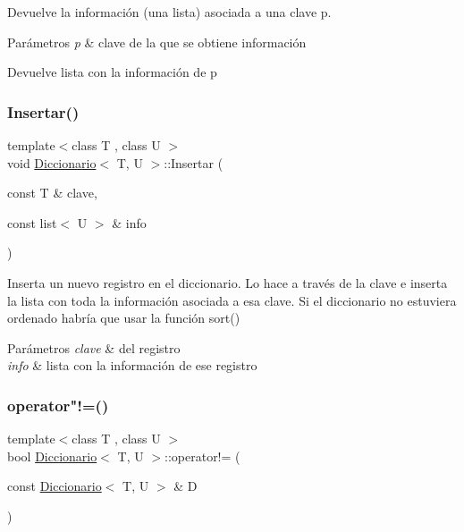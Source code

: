 Devuelve la información (una lista) asociada a una clave p. 


\begin{DoxyParams}{Parámetros}
{\em p} & clave de la que se obtiene información \\
\hline
\end{DoxyParams}
\begin{DoxyReturn}{Devuelve}
lista con la información de p 
\end{DoxyReturn}
\mbox{\label{classDiccionario_af520b73907852cc8002260ddf9fb822c}} 
\subsubsection{\texorpdfstring{Insertar()}{Insertar()}}
{\footnotesize\ttfamily template$<$class T , class U $>$ \\
void \hyperlink{classDiccionario}{Diccionario}$<$ T, U $>$\+::Insertar (\begin{DoxyParamCaption}\item[{const T \&}]{clave,  }\item[{const list$<$ U $>$ \&}]{info }\end{DoxyParamCaption})}



Inserta un nuevo registro en el diccionario. Lo hace a través de la clave e inserta la lista con toda la información asociada a esa clave. Si el diccionario no estuviera ordenado habría que usar la función sort() 


\begin{DoxyParams}{Parámetros}
{\em clave} & del registro \\
\hline
{\em info} & lista con la información de ese registro \\
\hline
\end{DoxyParams}
\mbox{\label{classDiccionario_ab08d7027cfbc561abb289e801849ee2e}} 
\subsubsection{\texorpdfstring{operator"!=()}{operator!=()}}
{\footnotesize\ttfamily template$<$class T , class U $>$ \\
bool \hyperlink{classDiccionario}{Diccionario}$<$ T, U $>$\+::operator!= (\begin{DoxyParamCaption}\item[{const \hyperlink{classDiccionario}{Diccionario}$<$ T, U $>$ \&}]{D }\end{DoxyParamCaption})}



